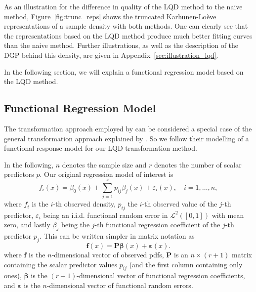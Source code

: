 As an illustration for the difference in quality of the LQD method to the naive method,
Figure~\ref{fig:trunc_reps} shows the truncated Karhunen-Loève representations of a
sample density with both methods. One can clearly see that the representations based on
the LQD method produce much better fitting curves than the naive method. Further
illustrations, as well as the description of the DGP behind this density, are given in
Appendix~\ref{sec:illustration_lqd}.

In the following section, we will explain a functional regression model based on the
LQD method.

\subsection{Functional Regression Model}
\label{sec:func_reg_model}
The transformation approach employed by \textcite{TalskaEtAl2018} can be considered a
special case of the general transformation approach explained by \textcite{PetersenMüller2016}
\parencite[cf.][]{PetersenZhangKokoszka2022}. So we follow their modelling of a functional
response model for our LQD transformation method.

In the following, $n$ denotes the sample size and $r$ denotes the number of scalar
predictors $p$. Our original regression model of interest is
\begin{equation}
    \label{eq:dens_reg_model}
    f_i(x) = \beta_0(x) + \sum_{j=1}^{r} p_{ij} \beta_j(x) + \varepsilon_i(x), \quad i = 1, \ldots, n,
\end{equation}
where $f_i$ is the $i$-th observed density, $p_{ij}$ the $i$-th observed value of the
$j$-th predictor, $\varepsilon_i$ being an i.i.d. functional random error in $\mathcal{L}^2([0,1])$
with mean zero, and lastly $\beta_j$ being the $j$-th functional regression coefficient of the $j$-th
predictor $p_j$. This can be written simpler in matrix notation as
\begin{equation}
    \label{eq:dens_reg_model_matrix}
    \mathbf{f}(x) = \mathbf{P} \boldsymbol{\beta}(x) + \boldsymbol{\varepsilon}(x).
\end{equation}
where $\mathbf{f}$ is the $n$-dimensional vector of observed pdfs, $\mathbf{P}$ is an $n \times (r+1)$
matrix containing the scalar predictor values $p_{ij}$ (and the first column containing only
ones), $\boldsymbol{\beta}$ is the $(r+1)$-dimensional vector of functional regression coefficients,
and $\boldsymbol{\varepsilon}$ is the $n$-dimensional vector of functional random errors.

